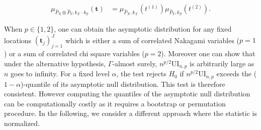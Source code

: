 \begin{align*}
     \mu_{\widehat{P}_X\otimes\widehat{P}_Y,k_{\mathcal{X}}\cdot k_{\mathcal{Y}}}(\mathbf{t})&= \mu_{\widehat{P}_X,k_{\mathcal{X}}}(t^{(1)}) \mu_{\widehat{P}_Y,k_{\mathcal{Y}}}(t^{(2)}).
\end{align*}

When $p\in\{1,2\}$, one can obtain the asymptotic distribution for any fixed locations $(\mathbf{t}_j)_{j=1}^J$ which is either a sum of correlated Nakagami variables ($p=1$) or a sum of correlated chi square variables ($p=2$). Moreover one can show that under the alternative hypothesis, $\Gamma$-almost surely, $n^{p/2}\text{UI}_{n,p}$ is  arbitrarily large as $n$ goes to infinity. For a fixed level $\alpha$, the test rejects $H_0$ if $n^{p/2}\text{UI}_{n,p}$ exceeds the ($1 - \alpha$)-quantile of its asymptotic null distribution. This test is therefore consistent. However computing the quantiles of the asymptotic null distribution can be computationally costly as it requires a bootstrap or permutation procedure. In the following, we consider a different approach where the statistic is normalized.

